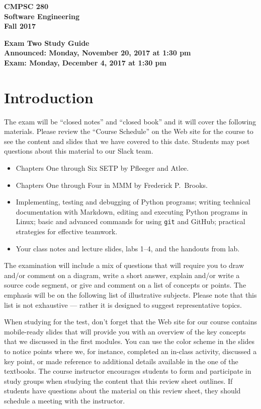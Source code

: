 \documentclass[11pt]{article}
\newcommand{\assignmentduedate}{December 4}
\newcommand{\assignmentassignedate}{November 20}
\newcommand{\assignmentnumber}{Two}
\newcommand{\labyear}{2017}
\newcommand{\assignedday}{Monday}
\newcommand{\dueday}{Monday}
\newcommand{\labtime}{1:30 pm}
\newcommand{\assigneddate}{Announced: \assignedday, \assignmentassignedate, \labyear{} at \labtime{}}
\newcommand{\duedate}{Exam: \dueday, \assignmentduedate, \labyear{} at \labtime{}}
\newcommand{\guidetitle}[1]
{
  \begin{center}
    \begin{center}
      \bf
      CMPSC 280\\Software Engineering\\
      Fall 2017\\
      \medskip
    \end{center}
    \bf
    #1
  \end{center}
}
\begin{document}
\thispagestyle{empty}

\guidetitle{Exam \assignmentnumber{} Study Guide \\ \assigneddate{} \\ \duedate{}}

\section*{Introduction}

\noindent
The exam will be ``closed notes'' and ``closed book'' and it will cover the
following materials. Please review the ``Course Schedule'' on the Web site for
the course to see the content and slides that we have covered to this date.
Students may post questions about this material to our Slack team.

\begin{itemize}

  \itemsep 0in

  \item Chapters One through Six SETP by Pfleeger and Atlee.

  \item Chapters One through Four in MMM by Frederick P.\ Brooks.

  \item Implementing, testing and debugging of Python programs; writing
    technical documentation with Markdown, editing and executing Python programs
    in Linux; basic and advanced commands for using {\tt git} and GitHub;
    practical strategies for effective teamwork.

  \item Your class notes and lecture slides, labs 1--4, and the handouts from
    lab.

\end{itemize}

\noindent The examination will include a mix of questions that will require you
to draw and/or comment on a diagram, write a short answer, explain and/or write
a source code segment, or give and comment on a list of concepts or points. The
emphasis will be on the following list of illustrative subjects. Please note
that this list is not exhaustive --- rather it is designed to suggest
representative topics.

When studying for the test, don't forget that the Web site for our course
contains mobile-ready slides that will provide you with an overview of the key
concepts that we discussed in the first modules. You can use the color scheme in
the slides to notice points where we, for instance, completed an in-class
activity, discussed a key point, or made reference to additional details
available in the one of the textbooks. The course instructor encourages students
to form and participate in study groups when studying the content that this
review sheet outlines. If students have questions about the material on this
review sheet, they should schedule a meeting with the instructor.
\end{document}
